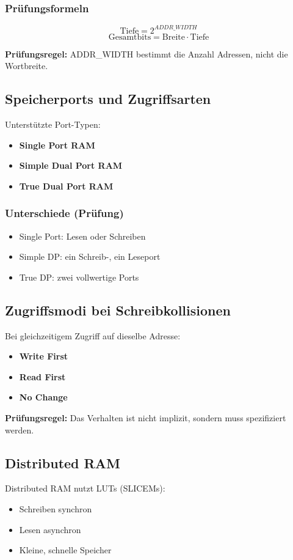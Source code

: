 \documentclass[11pt,a4paper]{article}
\newcommand{\hilite}[1]{\colorbox{yellow!25}{#1}}
\newcommand{\imp}[1]{\textbf{\textcolor{codeemph}{#1}}}
\begin{document}
\subsubsection*{\textcolor{codeemph}{Prüfungsformeln}}
\[
\text{Tiefe} = 2^{ADDR\_WIDTH}
\]
\[
\text{Gesamtbits} = \text{Breite} \cdot \text{Tiefe}
\]

\imp{Prüfungsregel:}  
\hilite{ADDR}\_\hilite{WIDTH} \hilite{bestimmt} die Anzahl Adressen, nicht die Wortbreite.

\subsection{Speicherports und Zugriffsarten}
Unterstützte Port-Typen:
\begin{itemize}
  \item \textbf{Single Port RAM}
  \item \textbf{Simple Dual Port RAM}
  \item \textbf{True Dual Port RAM}
\end{itemize}

\subsubsection*{\textcolor{codeemph}{Unterschiede (Prüfung)}}
\begin{itemize}
  \item Single Port: Lesen oder Schreiben
  \item Simple DP: ein Schreib-, ein Leseport
  \item True DP: zwei vollwertige Ports
\end{itemize}

\subsection{Zugriffsmodi bei Schreibkollisionen}
Bei gleichzeitigem Zugriff auf dieselbe Adresse:
\begin{itemize}
  \item \textbf{Write First}
  \item \textbf{Read First}
  \item \textbf{No Change}
\end{itemize}

\imp{Prüfungsregel:}  
Das \hilite{Verhalten} ist nicht \hilite{implizit}, \hilite{sondern} muss spezifiziert werden.

\subsection{Distributed RAM}
Distributed RAM nutzt LUTs (SLICEMs):
\begin{itemize}
  \item Schreiben synchron
  \item Lesen asynchron
  \item Kleine, schnelle Speicher
\end{itemize}
\end{document}
